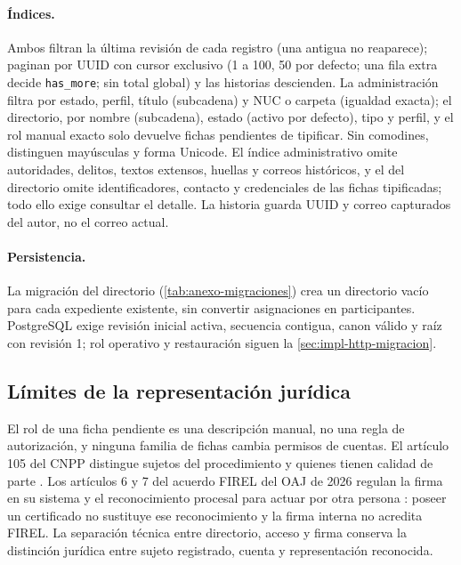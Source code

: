 \paragraph{Índices.} Ambos filtran la última revisión de cada registro (una antigua no reaparece); paginan por UUID con cursor exclusivo (1 a 100, 50 por defecto; una fila extra decide \texttt{has\_more}; sin total global) y las historias descienden. La administración filtra por estado, perfil, título (subcadena) y NUC o carpeta (igualdad exacta); el directorio, por nombre (subcadena), estado (activo por defecto), tipo y perfil, y el rol manual exacto solo devuelve fichas pendientes de tipificar. Sin comodines, distinguen mayúsculas y forma Unicode. El índice administrativo omite autoridades, delitos, textos extensos, huellas y correos históricos, y el del directorio omite identificadores, contacto y credenciales de las fichas tipificadas; todo ello exige consultar el detalle. La historia guarda UUID y correo capturados del autor, no el correo actual.

\paragraph{Persistencia.} La migración del directorio (\cref{tab:anexo-migraciones}) crea un directorio vacío para cada expediente existente, sin convertir asignaciones en participantes. PostgreSQL exige revisión inicial activa, secuencia contigua, canon válido y raíz con revisión 1; rol operativo y restauración siguen la \cref{sec:impl-http-migracion}.



\subsection{Límites de la representación jurídica}\label{sec:impl-participantes-limites}

El rol de una ficha pendiente es una descripción manual, no una regla de autorización, y ninguna familia de fichas cambia permisos de cuentas. El artículo 105 del CNPP distingue sujetos del procedimiento y quienes tienen calidad de parte \cite{cnpp_consolidado2025}. Los artículos 6 y 7 del acuerdo FIREL del OAJ de 2026 regulan la firma en su sistema y el reconocimiento procesal para actuar por otra persona \cite{oaj_firel2026}: poseer un certificado no sustituye ese reconocimiento y la firma interna no acredita FIREL. La separación técnica entre directorio, acceso y firma conserva la distinción jurídica entre sujeto registrado, cuenta y representación reconocida.

